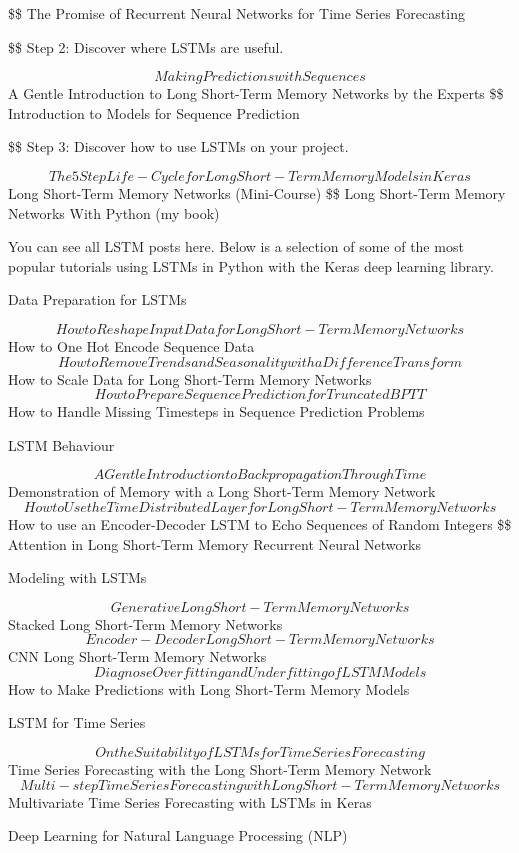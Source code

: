 \documentclass[11pt]{article}
\begin{document}
\$\$ The Promise of Recurrent Neural Networks for Time Series Forecasting

\$\$ Step 2: Discover where LSTMs are useful. 

$$ Making Predictions with Sequences
 $$ A Gentle Introduction to Long Short-Term Memory Networks by the Experts
\$\$ Introduction to Models for Sequence Prediction

\$\$ Step 3: Discover how to use LSTMs on your project. 

$$ The 5 Step Life-Cycle for Long Short-Term Memory Models in Keras
 $$ Long Short-Term Memory Networks (Mini-Course)
\$\$ Long Short-Term Memory Networks With Python (my book)

You can see all LSTM posts here. Below is a selection of some of the most popular tutorials using LSTMs in Python with the Keras deep learning library.

Data Preparation for LSTMs

$$ How to Reshape Input Data for Long Short-Term Memory Networks
$$ How to One Hot Encode Sequence Data
$$ How to Remove Trends and Seasonality with a Difference Transform
$$ How to Scale Data for Long Short-Term Memory Networks
$$ How to Prepare Sequence Prediction for Truncated BPTT
$$ How to Handle Missing Timesteps in Sequence Prediction Problems

LSTM Behaviour

$$ A Gentle Introduction to Backpropagation Through Time
$$ Demonstration of Memory with a Long Short-Term Memory Network
$$ How to Use the TimeDistributed Layer for Long Short-Term Memory Networks
$$ How to use an Encoder-Decoder LSTM to Echo Sequences of Random Integers
\$\$ Attention in Long Short-Term Memory Recurrent Neural Networks

Modeling with LSTMs

$$ Generative Long Short-Term Memory Networks
$$ Stacked Long Short-Term Memory Networks
$$ Encoder-Decoder Long Short-Term Memory Networks
$$ CNN Long Short-Term Memory Networks
$$ Diagnose Overfitting and Underfitting of LSTM Models
$$ How to Make Predictions with Long Short-Term Memory Models

LSTM for Time Series

$$ On the Suitability of LSTMs for Time Series Forecasting
$$ Time Series Forecasting with the Long Short-Term Memory Network
$$ Multi-step Time Series Forecasting with Long Short-Term Memory Networks
$$ Multivariate Time Series Forecasting with LSTMs in Keras

Deep Learning for Natural Language Processing (NLP)
\end{document}
